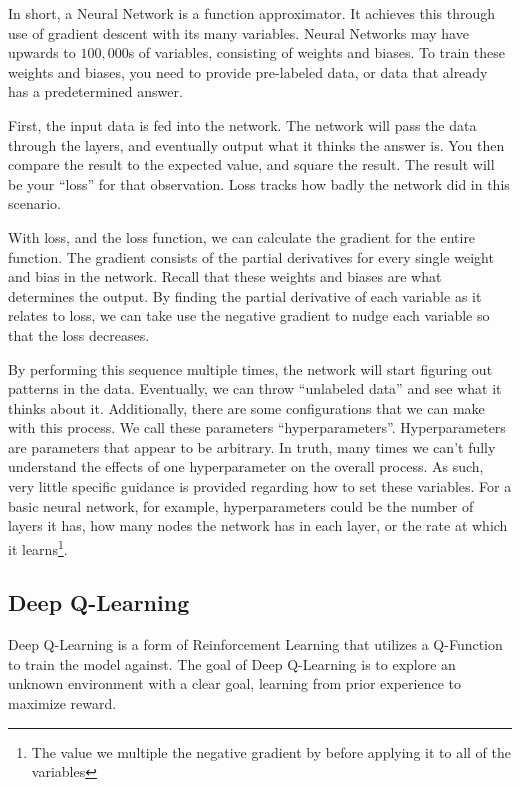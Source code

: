 \documentclass[12pt]{article}
\begin{document}
In short, a Neural Network is a function approximator. It achieves this through use of gradient descent with its many variables. Neural Networks may have upwards to $100,000$s of variables, consisting of weights and biases. To train these weights and biases, you need to provide pre-labeled data, or data that already has a predetermined answer.

First, the input data is fed into the network. The network will pass the data through the layers, and eventually output what it thinks the answer is. You then compare the result to the expected value, and square the result. The result will be your ``loss'' for that observation. Loss tracks how badly the network did in this scenario.

With loss, and the loss function, we can calculate the gradient for the entire function. The gradient consists of the partial derivatives for every single weight and bias in the network. Recall that these weights and biases are what determines the output. By finding the partial derivative of each variable as it relates to loss, we can take use the negative gradient to nudge each variable so that the loss decreases.

By performing this sequence multiple times, the network will start figuring out patterns in the data. Eventually, we can throw ``unlabeled data'' and see what it thinks about it. Additionally, there are some configurations that we can make with this process. We call these parameters ``hyperparameters''. Hyperparameters are parameters that appear to be arbitrary. In truth, many times we can't fully understand the effects of one hyperparameter on the overall process. As such, very little specific guidance is provided regarding how to set these variables. For a basic neural network, for example, hyperparameters could be the number of layers it has, how many nodes the network has in each layer, or the rate at which it learns\footnote{The value we multiple the negative gradient by before applying it to all of the variables}.

\subsection{Deep Q-Learning}


Deep Q-Learning is a form of Reinforcement Learning that utilizes a Q-Function to train the model against. The goal of Deep Q-Learning is to explore an unknown environment with a clear goal, learning from prior experience to maximize reward.
\end{document}
